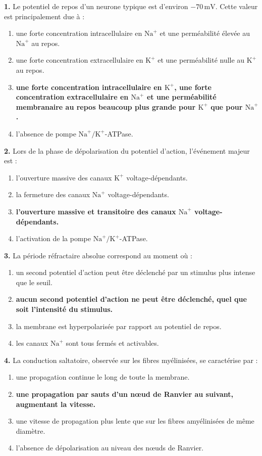 \documentclass[11pt]{article}
\begin{document}
\begin{exercice}
\textbf{1.} Le potentiel de repos d'un neurone typique est d'environ $-70\,\text{mV}$. Cette valeur est principalement due à :
\begin{enumerate}[label=\Alph*.]
\item une forte concentration intracellulaire en $\text{Na}^+$ et une perméabilité élevée au $\text{Na}^+$ au repos.
\item une forte concentration extracellulaire en $\text{K}^+$ et une perméabilité nulle au $\text{K}^+$ au repos.
\item \textbf{une forte concentration intracellulaire en $\text{K}^+$, une forte concentration extracellulaire en $\text{Na}^+$ et une perméabilité membranaire au repos beaucoup plus grande pour $\text{K}^+$ que pour $\text{Na}^+$.}
\item l'absence de pompe $\text{Na}^+/\text{K}^+$-ATPase.
\end{enumerate}

\textbf{2.} Lors de la phase de dépolarisation du potentiel d'action, l'événement majeur est :
\begin{enumerate}[label=\Alph*.]
\item l'ouverture massive des canaux $\text{K}^+$ voltage-dépendants.
\item la fermeture des canaux $\text{Na}^+$ voltage-dépendants.
\item \textbf{l'ouverture massive et transitoire des canaux $\text{Na}^+$ voltage-dépendants.}
\item l'activation de la pompe $\text{Na}^+/\text{K}^+$-ATPase.
\end{enumerate}

\textbf{3.} La période réfractaire absolue correspond au moment où :
\begin{enumerate}[label=\Alph*.]
\item un second potentiel d'action peut être déclenché par un stimulus plus intense que le seuil.
\item \textbf{aucun second potentiel d'action ne peut être déclenché, quel que soit l'intensité du stimulus.}
\item la membrane est hyperpolarisée par rapport au potentiel de repos.
\item les canaux $\text{Na}^+$ sont tous fermés et activables.
\end{enumerate}

\textbf{4.} La conduction saltatoire, observée sur les fibres myélinisées, se caractérise par :
\begin{enumerate}[label=\Alph*.]
\item une propagation continue le long de toute la membrane.
\item \textbf{une propagation par sauts d'un nœud de Ranvier au suivant, augmentant la vitesse.}
\item une vitesse de propagation plus lente que sur les fibres amyélinisées de même diamètre.
\item l'absence de dépolarisation au niveau des nœuds de Ranvier.
\end{enumerate}
\end{exercice}
\end{document}
